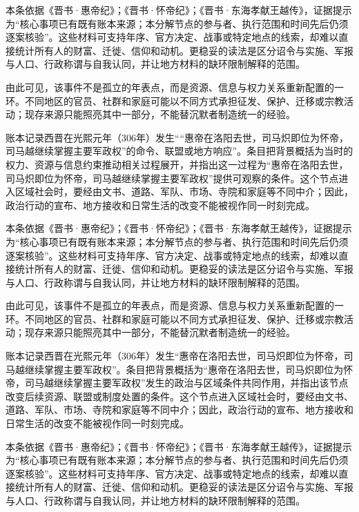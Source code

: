 本条依据《晋书·惠帝纪》；《晋书·怀帝纪》；《晋书·东海孝献王越传》，证据提示为“核心事项已有既有账本来源；本分解节点的参与者、执行范围和时间先后仍须逐案核验”。这些材料可支持年序、官方决定、战事或特定地点的线索，却难以直接统计所有人的财富、迁徙、信仰和动机。更稳妥的读法是区分诏令与实施、军报与人口、行政称谓与自我认同，并让地方材料的缺环限制解释的范围。

由此可见，该事件不是孤立的年表点，而是资源、信息与权力关系重新配置的一环。不同地区的官员、社群和家庭可能以不同方式承担征发、保护、迁移或宗教活动；现存来源只能照亮其中一部分，不能替沉默者制造统一的经验。

账本记录西晋在光熙元年（306年）发生““惠帝在洛阳去世，司马炽即位为怀帝，司马越继续掌握主要军政权”的命令、联盟或地方响应”。条目把背景概括为当时的权力、资源与信息约束推动相关过程展开，并指出这一过程为“惠帝在洛阳去世，司马炽即位为怀帝，司马越继续掌握主要军政权”提供可观察的条件。这个节点进入区域社会时，要经由文书、道路、军队、市场、寺院和家庭等不同中介；因此，政治行动的宣布、地方接收和日常生活的改变不能被视作同一时刻完成。

本条依据《晋书·惠帝纪》；《晋书·怀帝纪》；《晋书·东海孝献王越传》，证据提示为“核心事项已有既有账本来源；本分解节点的参与者、执行范围和时间先后仍须逐案核验”。这些材料可支持年序、官方决定、战事或特定地点的线索，却难以直接统计所有人的财富、迁徙、信仰和动机。更稳妥的读法是区分诏令与实施、军报与人口、行政称谓与自我认同，并让地方材料的缺环限制解释的范围。

由此可见，该事件不是孤立的年表点，而是资源、信息与权力关系重新配置的一环。不同地区的官员、社群和家庭可能以不同方式承担征发、保护、迁移或宗教活动；现存来源只能照亮其中一部分，不能替沉默者制造统一的经验。

账本记录西晋在光熙元年（306年）发生“惠帝在洛阳去世，司马炽即位为怀帝，司马越继续掌握主要军政权”。条目把背景概括为“惠帝在洛阳去世，司马炽即位为怀帝，司马越继续掌握主要军政权”发生的政治与区域条件共同作用，并指出该节点改变后续资源、联盟或制度处置的条件。这个节点进入区域社会时，要经由文书、道路、军队、市场、寺院和家庭等不同中介；因此，政治行动的宣布、地方接收和日常生活的改变不能被视作同一时刻完成。

本条依据《晋书·惠帝纪》；《晋书·怀帝纪》；《晋书·东海孝献王越传》，证据提示为“核心事项已有既有账本来源；本分解节点的参与者、执行范围和时间先后仍须逐案核验”。这些材料可支持年序、官方决定、战事或特定地点的线索，却难以直接统计所有人的财富、迁徙、信仰和动机。更稳妥的读法是区分诏令与实施、军报与人口、行政称谓与自我认同，并让地方材料的缺环限制解释的范围。


